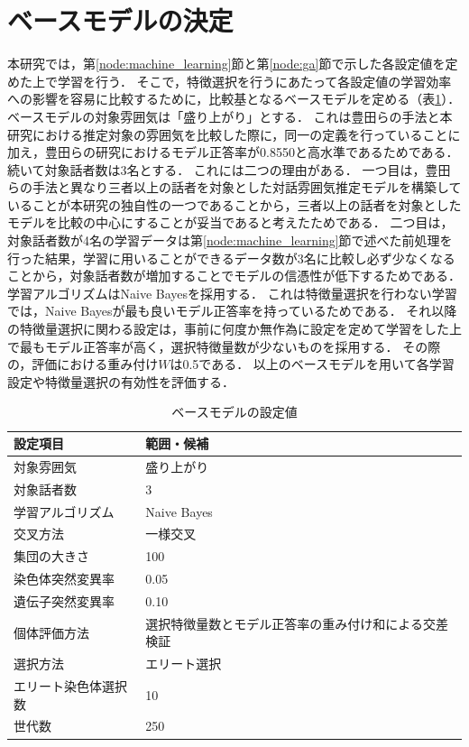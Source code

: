 

\section{ベースモデルの決定\label{node:base_model}}

本研究では，第\ref{node:machine_learning}節と第\ref{node:ga}節で示した各設定値を定めた上で学習を行う．
そこで，特徴選択を行うにあたって各設定値の学習効率への影響を容易に比較するために，比較基となるベースモデルを定める（表\ref{tab:base_model_setting}）．
ベースモデルの対象雰囲気は「盛り上がり」とする．
これは豊田らの手法と本研究における推定対象の雰囲気を比較した際に，同一の定義を行っていることに加え，豊田らの研究におけるモデル正答率が0.8550と高水準であるためである．
続いて対象話者数は3名とする．
これには二つの理由がある．
一つ目は，豊田らの手法と異なり三者以上の話者を対象とした対話雰囲気推定モデルを構築していることが本研究の独自性の一つであることから，三者以上の話者を対象としたモデルを比較の中心にすることが妥当であると考えたためである．
二つ目は，対象話者数が4名の学習データは第\ref{node:machine_learning}節で述べた前処理を行った結果，学習に用いることができるデータ数が3名に比較し必ず少なくなることから，対象話者数が増加することでモデルの信憑性が低下するためである．
学習アルゴリズムはNaive Bayesを採用する．
これは特徴量選択を行わない学習では，Naive Bayesが最も良いモデル正答率を持っているためである．
それ以降の特徴量選択に関わる設定は，事前に何度か無作為に設定を定めて学習をした上で最もモデル正答率が高く，選択特徴量数が少ないものを採用する．
その際の，評価における重み付け$W$は0.5である．
以上のベースモデルを用いて各学習設定や特徴量選択の有効性を評価する．

\begin{table}[t]
    \caption{ベースモデルの設定値}
    \centering
    \begin{tabular}{ll}
        \hline
        設定項目 & 範囲・候補 \\ \hline\hline
        対象雰囲気 & 盛り上がり \\ \hline
        対象話者数 & 3 \\ \hline
        学習アルゴリズム & Naive Bayes \\ \hline
        交叉方法 & 一様交叉 \\ \hline
        集団の大きさ & 100 \\ \hline
        染色体突然変異率 & 0.05 \\ \hline
        遺伝子突然変異率 & 0.10 \\ \hline
        個体評価方法 & 選択特徴量数とモデル正答率の重み付け和による交差検証 \\ \hline
        選択方法 & エリート選択 \\ \hline
        エリート染色体選択数 & 10 \\ \hline
        世代数 & 250 \\ \hline
    \end{tabular}
    \label{tab:base_model_setting}
\end{table}


